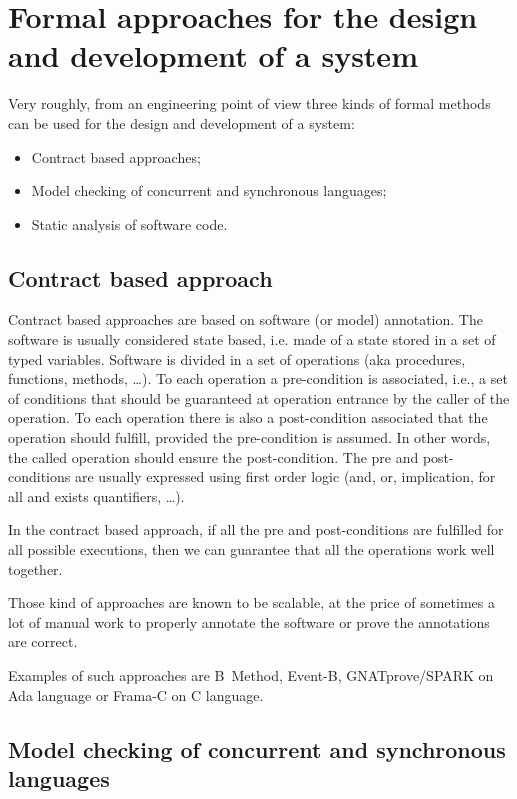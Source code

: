 \section{Formal approaches for the design and development of a system}
\label{sec:formalDesign}

Very roughly, from an engineering point of view three kinds of formal
methods can be used for the design and development of a system:
\begin{itemize}
\item Contract based approaches;
\item Model checking of concurrent and synchronous languages;
\item Static analysis of software code.
\end{itemize}

\subsection{Contract based approach}
\label{sec:contr-based-appr}

Contract based approaches are based on software (or model)
annotation. The software is usually considered state based, i.e. made of
a state stored in a set of typed variables.  Software is divided in a
set of operations (aka procedures, functions, methods, \ldots). To each
operation a pre-condition is associated, i.e., a set of conditions that
should be guaranteed at operation entrance by the caller of the
operation. To each operation there is also a post-condition associated
that the operation should fulfill, provided the pre-condition is
assumed. In other words, the called operation should ensure the
post-condition. The pre and post-conditions are usually expressed using
first order logic (and, or, implication, for all and exists quantifiers,
\ldots).

In the contract based approach, if all the pre and post-conditions are
fulfilled for all possible executions, then we can guarantee that all
the operations work well together.

Those kind of approaches are known to be scalable, at the price of
sometimes a lot of manual work to properly annotate the software or
prove the annotations are correct.

Examples of such approaches are B~Method, Event-B, GNATprove/SPARK on
Ada language or Frama-C on C language.

\subsection{Model checking of concurrent and synchronous languages}

